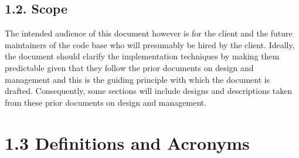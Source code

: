 \documentclass[]{article}
\begin{document}
\subsection{\textbf{1.2. Scope}}\label{scope}

The intended audience of this document however is for the client and the
future maintainers of the code base who will presumably be hired by the
client. Ideally, the document should clarify the implementation
techniques by making them predictable given that they follow the prior
documents on design and management and this is the guiding principle
with which the document is drafted. Consequently, some sections will
include designs and descriptions taken from these prior documents on
design and management.

\section{1.3 Definitions and
Acronyms}\label{definitions-and-acronyms}
\end{document}
